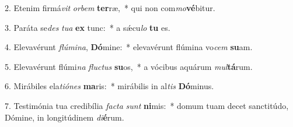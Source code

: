 2. Etenim firmá\textit{vit} \textit{or}\textit{bem} \textbf{ter}ræ,~*  qui non com\textit{mo}\textbf{vé}bitur.\

3. Paráta se\textit{des} \textit{tu}\textit{a} \textbf{ex} tunc:~*  a sǽcu\textit{lo} \textbf{tu} es.\

4. Elevavérunt \textit{flú}\textit{mi}\textit{na}, \textbf{Dó}mine:~*  elevavérunt flúmina vo\textit{cem} \textbf{su}am.\

5. Elevavérunt flúmi\textit{na} \textit{fluc}\textit{tus} \textbf{su}os,~*  a vócibus aquárum \textit{mul}\textbf{tá}rum.\

6. Mirábiles ela\textit{ti}\textit{ó}\textit{nes} \textbf{ma}ris:~*  mirábilis in al\textit{tis} \textbf{Dó}minus.\

7. Testimónia tua credibília \textit{fac}\textit{ta} \textit{sunt} \textbf{ni}mis:~*  domum tuam decet sanctitúdo, Dómine, in longitúdinem \textit{di}\textbf{é}rum.\

